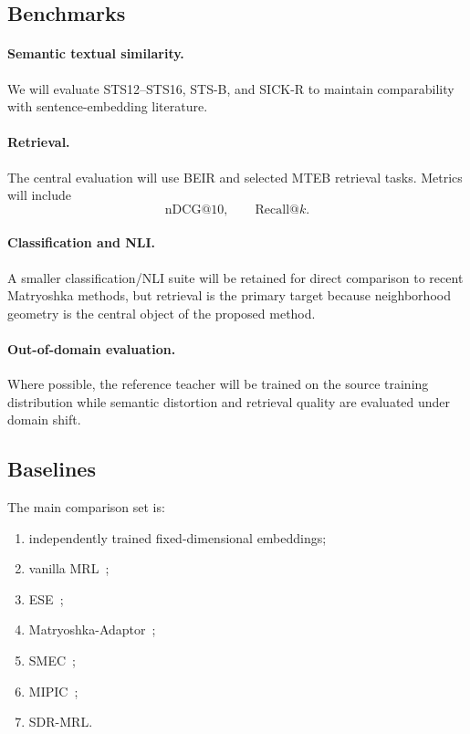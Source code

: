 \documentclass[11pt]{article}
\begin{document}
\subsection{Benchmarks}

\paragraph{Semantic textual similarity.}
We will evaluate STS12--STS16, STS-B, and SICK-R to maintain comparability with sentence-embedding literature.

\paragraph{Retrieval.}
The central evaluation will use BEIR and selected MTEB retrieval tasks.
Metrics will include
\begin{equation}
    \mathrm{nDCG}@10,
    \qquad
    \mathrm{Recall}@k.
\end{equation}

\paragraph{Classification and NLI.}
A smaller classification/NLI suite will be retained for direct comparison to recent Matryoshka methods, but retrieval is the primary target because neighborhood geometry is the central object of the proposed method.

\paragraph{Out-of-domain evaluation.}
Where possible, the reference teacher will be trained on the source training distribution while semantic distortion and retrieval quality are evaluated under domain shift.


\subsection{Baselines}

The main comparison set is:

\begin{enumerate}[leftmargin=1.5em]
    \item independently trained fixed-dimensional embeddings;
    \item vanilla MRL~\cite{kusupati2022matryoshka};
    \item ESE~\cite{li2025ese};
    \item Matryoshka-Adaptor~\cite{yoon2024matryoshka};
    \item SMEC~\cite{zhang2025smec};
    \item MIPIC~\cite{huy2026mipic};
    \item SDR-MRL.
\end{enumerate}
\end{document}
